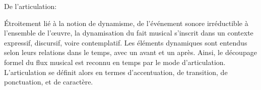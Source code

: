 \documentclass{article}
\begin{document}
De l'articulation:

\smallskip

\noindent Étroitement lié à la notion de dynamisme, 
de l'événement sonore irréductible à l'ensemble de l'œuvre,
la dynamisation du fait musical
s'inscrit dans un contexte expressif, discursif, voire
 contemplatif. 
 Les éléments dynamiques sont entendus selon leurs relations dans le temps, avec un avant et un après.
Ainsi, le découpage formel du flux musical est reconnu en temps par le mode d’articulation.
L'articulation se définit alors en termes d'accentuation, de transition, de ponctuation, et de caractère.


\end{document}
